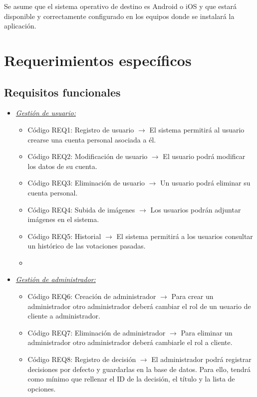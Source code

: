 Se asume que el sistema operativo de destino es Android o iOS y que estará disponible y correctamente configurado en los equipos donde se instalará la aplicación.

\section{Requerimientos específicos}

\subsection{Requisitos funcionales}

\begin{itemize}
    \item \textit{\uline{Gestión de usuario:}}
        \begin{itemize}
            \item Código REQ1: Registro de usuario $\rightarrow$ El sistema permitirá al usuario crearse una cuenta personal asociada a él.
            \item Código REQ2: Modificación de usuario $\rightarrow$ El usuario podrá modificar los datos de su cuenta.
            \item Código REQ3: Eliminación de usuario $\rightarrow$ Un usuario podrá eliminar su cuenta personal.
            \item Código REQ4: Subida de imágenes $\rightarrow$ Los usuarios podrán adjuntar imágenes en el sistema.
            \item Código REQ5: Historial $\rightarrow$ El sistema permitirá a los usuarios consultar un histórico de las votaciones pasadas.
            \item 
        \end{itemize}
    \item \textit{\uline{Gestión de administrador:}} 
        \begin{itemize}
          \item Código REQ6: Creación de administrador $\rightarrow$ Para crear un administrador otro administrador deberá cambiar el rol de un usuario de cliente a administrador.
          \item Código REQ7: Eliminación de administrador $\rightarrow$ Para eliminar un administrador otro administrador deberá cambiarle el rol a cliente.
          \item Código REQ8: Registro de decisión $\rightarrow$ El administrador podrá registrar decisiones por defecto y guardarlas en la base de datos. Para ello, tendrá como mínimo que rellenar el ID de la decisión, el título y la lista de opciones.  

\end{itemize}
\end{itemize}
